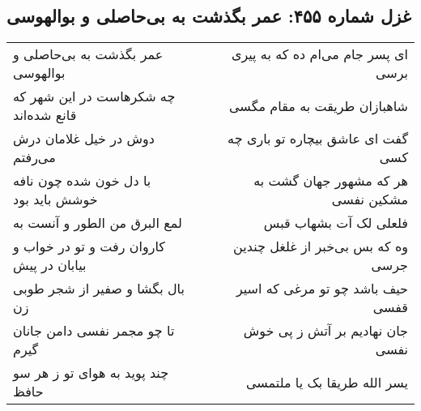 \begin{center}
\section*{غزل شماره ۴۵۵: عمر بگذشت به بی‌حاصلی و بوالهوسی}
\label{sec:sh455}
\begin{longtable}{l p{0.5cm} r}
عمر بگذشت به بی‌حاصلی و بوالهوسی
&&
ای پسر جام می‌ام ده که به پیری برسی
\\
چه شکرهاست در این شهر که قانع شده‌اند
&&
شاهبازان طریقت به مقام مگسی
\\
دوش در خیل غلامان درش می‌رفتم
&&
گفت ای عاشق بیچاره تو باری چه کسی
\\
با دل خون شده چون نافه خوشش باید بود
&&
هر که مشهور جهان گشت به مشکین نفسی
\\
لمع البرق من الطور و آنست به
&&
فلعلی لک آت بشهاب قبس
\\
کاروان رفت و تو در خواب و بیابان در پیش
&&
وه که بس بی‌خبر از غلغل چندین جرسی
\\
بال بگشا و صفیر از شجر طوبی زن
&&
حیف باشد چو تو مرغی که اسیر قفسی
\\
تا چو مجمر نفسی دامن جانان گیرم
&&
جان نهادیم بر آتش ز پی خوش نفسی
\\
چند پوید به هوای تو ز هر سو حافظ
&&
یسر الله طریقا بک یا ملتمسی
\\
\end{longtable}
\end{center}
